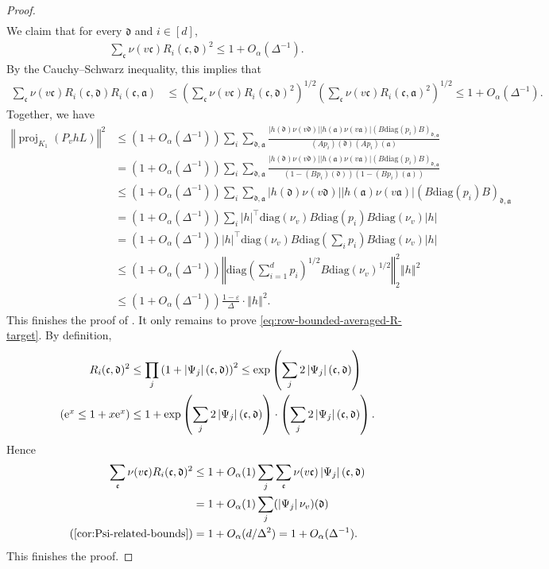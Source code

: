 \documentclass[a4paper,12pt]{article}
\theoremstyle{plain}
\theoremstyle{definition}
\def\-#1{\mathrm{#1}} %
\def\!#1{\mathfrak{#1}} %
\def\-#1{\mathrm{#1}} %
\def\!#1{\mathfrak{#1}} %
\newcommand{\e}{\mathrm{e}}
\renewcommand{\epsilon}{\varepsilon}
\newcommand{\norm}[1]{\left\Vert#1\right\Vert}
\newcommand{\tuple}[1]{\left(#1\right)}
\newcommand{\tp}{\tuple}
\newcommand{\abs}[1]{\left\vert#1\right\vert}
\begin{document}
\begin{proof}
\begin{align*}
\end{align*}
We claim that for every $\!d$ and $i\in [d]$,
\begin{align} \label{eq:row-bounded-averaged-R-target}
  \sum_{\!c}\nu(v\!c)R_i(\!c,\!d)^2 \leq 1+O_\alpha(\Delta^{-1}).
\end{align}
By the Cauchy--Schwarz inequality, this implies that
\begin{align*}
  \sum_{\!c}\nu(v\!c) R_i(\!c,\!d)R_i(\!c,\!a)
  &\leq  \tp{
    \sum_{\!c}\nu(v\!c)R_i(\!c,\!d)^2
  }^{1/2}
  \tp{
    \sum_{\!c}\nu(v\!c)R_i(\!c,\!a)^2
  }^{1/2}
  \leq 1+O_\alpha(\Delta^{-1}).
\end{align*}
Together, we have
\begin{align*}
  \norm{\operatorname{proj}_{K_1}(P_vhL)}^2
  &\leq \tp{1 + O_\alpha(\Delta^{-1})} \sum_{i} \sum_{\!d,\!a} \frac{\abs{h(\!d)\nu(v\!d)}\abs{h(\!a)\nu(v\!a)}(B\mathrm{diag}(p_i)B)_{\!d,\!a}}{(Ap_i)(\!d)(Ap_i)(\!a)} \\
  &= \tp{1 + O_\alpha(\Delta^{-1})} \sum_{i} \sum_{\!d,\!a} \frac{\abs{h(\!d)\nu(v\!d)}\abs{h(\!a)\nu(v\!a)}(B\mathrm{diag}(p_i)B)_{\!d,\!a}}{(1-(Bp_i)(\!d))(1-(Bp_i)(\!a))} \\
  &\leq \tp{1 + O_\alpha(\Delta^{-1})} \sum_{i} \sum_{\!d,\!a} \abs{h(\!d)\nu(v\!d)}\abs{h(\!a)\nu(v\!a)}(B\mathrm{diag}(p_i)B)_{\!d,\!a} \\
  &= \tp{1 + O_\alpha(\Delta^{-1})} \sum_{i} \abs{h}^\intercal \mathrm{diag}(\nu_v) B\mathrm{diag}(p_i)B \mathrm{diag}(\nu_v) \abs{h} \\
  &= \tp{1 + O_\alpha(\Delta^{-1})} \abs{h}^\intercal \mathrm{diag}(\nu_v) B\mathrm{diag}\tp{\textstyle \sum_i p_i}B \mathrm{diag}(\nu_v) \abs{h} \\
  &\leq \tp{1 + O_\alpha(\Delta^{-1})} \norm{ \-{diag}\tp{\sum_{i=1}^d p_i}^{1/2} B \-{diag}\tp{\nu_v}^{1/2}}_2^2 \norm{h}^2 \\
  \tag{$\epsilon$-contraction}
  &\leq \tp{1 + O_\alpha(\Delta^{-1})} \frac{1-\epsilon}{\Delta}\cdot \norm{h}^2.
\end{align*}
This finishes the proof of .
%
It only remains to prove \eqref{eq:row-bounded-averaged-R-target}.
By definition, %
\begin{align*}
  R_i(\!c,\!d)^2
  &\leq \prod_j\tp{1 + \abs{\Psi_j}(\!c,\!d)}^2 
  \leq \exp\tp{\sum_j 2\abs{\Psi_j}(\!c,\!d)} \\
  \tag{$\e^x \leq 1 + x\e^x$}
  &\leq 1 + \exp\tp{\sum_j 2\abs{\Psi_j}(\!c,\!d)} \cdot \tp{\sum_j 2\abs{\Psi_j}(\!c,\!d)}.
\end{align*}
Hence
\begin{align*}
  \sum_{\!c}\nu(v\!c)R_i(\!c,\!d)^2
  &\leq 1 + O_\alpha(1)\sum_j\sum_{\!c}\nu(v\!c)\abs{\Psi_j}(\!c,\!d) \\
  &=1+O_\alpha(1)\sum_j(\abs{\Psi_j}\nu_v)(\!d) \\
  \tag{\Cref{cor:Psi-related-bounds}}
  &= 1 + O_\alpha(d/\Delta^2)
  = 1 + O_\alpha(\Delta^{-1}).
\end{align*}
This finishes the proof.
\end{proof}  
\end{document}
